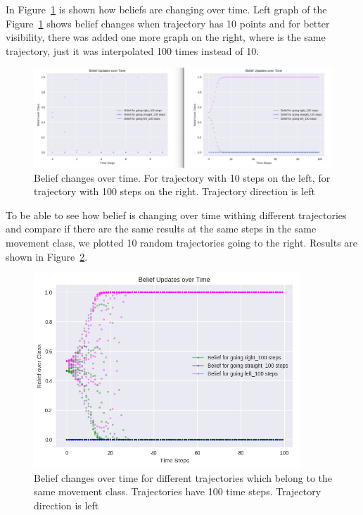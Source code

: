 In Figure~\ref{fig:CompareLeftT} is shown how beliefs are changing over time. Left graph of the Figure~\ref{fig:CompareLeftT} shows belief changes when trajectory has 10 points and for better visibility, there was added one more graph on the right, where is the same trajectory, just it was interpolated 100 times instead of 10.

\begin{figure}[h]
	\centering  	
	\includegraphics[width=15cm]{img/10_100_compared_left_T.jpg}
	\caption{Belief changes over time. For trajectory with 10 steps on the left, for trajectory with 100 steps on the right. Trajectory direction is left}
	\label{fig:CompareLeftT}    
\end{figure}

To be able to see how belief is changing over time withing different trajectories and compare if there are the same results at the same steps in the same movement class, we plotted 10 random trajectories going to the right. Results are shown in Figure~\ref{fig:10LeftsT}.

\begin{figure}[h]
	\centering  	
	\includegraphics[width=10cm]{img/10_Left_T.jpg}
	\caption{Belief changes over time for different trajectories which belong to the same movement class. Trajectories have 100 time steps. Trajectory direction is left}
	\label{fig:10LeftsT}    
\end{figure}

